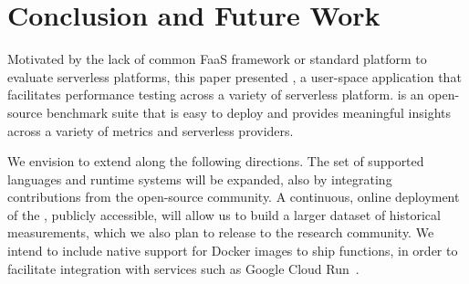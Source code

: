 
\section{Conclusion and Future Work}
\label{sec:conclusion}

Motivated by the lack of common FaaS framework or standard platform to evaluate serverless platforms, this paper presented \sys, a user-space application that facilitates performance testing across a variety of serverless platform.
\sys is an open-source benchmark suite that is easy to deploy and provides meaningful insights across a variety of metrics and serverless providers. 

We envision to extend \sys along the following directions.
The set of supported languages and runtime systems will be expanded, also by integrating contributions from the open-source community.
A continuous, online deployment of the \sys, publicly accessible, will allow us to build a larger dataset of historical measurements, which we also plan to release to the research community.
We intend to include native support for Docker images to ship functions, in order to facilitate integration with services such as Google Cloud Run~\cite{cloudrun}.


\newpage